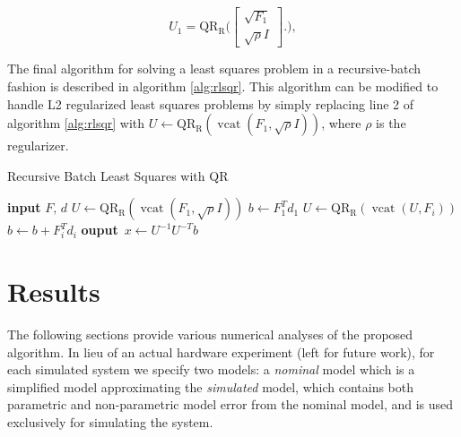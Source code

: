 \documentclass{article}
\begin{document}
\begin{equation}
  U_1 =  \operatorname{QR_R}\bigg( 
  \begin{bmatrix} \sqrt{F_1} \\ \sqrt{\rho} I \end{bmatrix}.
  \bigg),
\end{equation}

The final algorithm for solving a least squares problem in a recursive-batch fashion is
described in algorithm \ref{alg:rlsqr}. This algorithm can be modified to handle L2
regularized least squares problems by simply replacing line 2 of algorithm \ref{alg:rlsqr}
with $U\leftarrow \operatorname{QR_R}(\operatorname{vcat}(F_1,\sqrt{\rho}I))$, where $\rho$
is the regularizer. 
\begin{algorithm} 
  \begin{algorithmic}[1]
    \caption{Recursive Batch Least Squares with QR}\label{alg:rlsqr}
    \State \textbf{input} $F,\,d$  
    \State $U \leftarrow \operatorname{QR_R}(\operatorname{vcat}(F_1,\sqrt{\rho}I))$ 
    \State $b \leftarrow F_1^Td_1$ 
    \State $U \leftarrow \operatorname{QR_R}(\operatorname{vcat}(U,F_i)) $ 
    \State $b \leftarrow b + F_i^Td_i$ 
    \EndFor
    \State \textbf{ouput} \,$x \leftarrow U^{-1}U^{-T}b$ 
  \end{algorithmic}
\end{algorithm}

\section{Results} \label{sec:results}
The following sections provide various numerical analyses of the proposed algorithm. 
In lieu of an actual hardware experiment (left for future work), for each simulated system 
we specify two models: a \textit{nominal} model which is a simplified model approximating 
the \textit{simulated} model, which contains both parametric and non-parametric model 
error from the nominal model, and is used exclusively for simulating the system.
\end{document}

